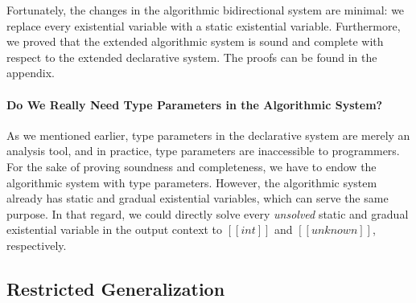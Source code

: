 Fortunately, the changes in the algorithmic bidirectional system are minimal: we replace
every existential variable with a static existential variable.
Furthermore, we proved that the extended
algorithmic system is sound and complete with respect to the extended
declarative system. The proofs can be found in the appendix.



\paragraph{Do We Really Need Type Parameters in the Algorithmic System?}

As we mentioned earlier, type parameters in the declarative system are merely an
analysis tool, and in practice, type parameters are inaccessible to
programmers. For the sake of proving soundness and completeness, we have to
endow the algorithmic system with type parameters. However, the algorithmic
system already has static and gradual existential variables, which can serve the same
purpose. In that regard, we could directly solve every \textit{unsolved} static and
gradual existential variable in the output context to $[[int]]$ and
$[[unknown]]$, respectively.




\subsection{Restricted Generalization}

